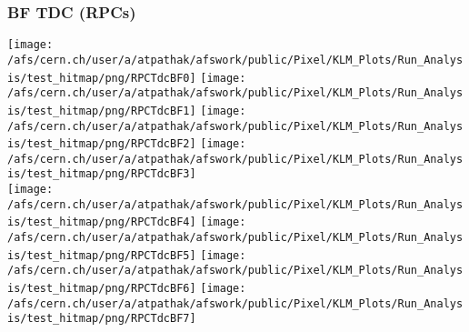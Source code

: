 \documentclass{beamer}
\begin{document}
\begin{frame}
\frametitle{BF TDC (RPCs)}
\vspace*{.05cm}
\begin{center}
\begin{normalsize}

\vspace*{-.2cm}
\begin{center}

  \texttt{[image: /afs/cern.ch/user/a/atpathak/afswork/public/Pixel/KLM\_Plots/Run\_Analysis/test\_hitmap/png/RPCTdcBF0]}
  \texttt{[image: /afs/cern.ch/user/a/atpathak/afswork/public/Pixel/KLM\_Plots/Run\_Analysis/test\_hitmap/png/RPCTdcBF1]}
  \texttt{[image: /afs/cern.ch/user/a/atpathak/afswork/public/Pixel/KLM\_Plots/Run\_Analysis/test\_hitmap/png/RPCTdcBF2]}
  \texttt{[image: /afs/cern.ch/user/a/atpathak/afswork/public/Pixel/KLM\_Plots/Run\_Analysis/test\_hitmap/png/RPCTdcBF3]} \\
  \texttt{[image: /afs/cern.ch/user/a/atpathak/afswork/public/Pixel/KLM\_Plots/Run\_Analysis/test\_hitmap/png/RPCTdcBF4]}
  \texttt{[image: /afs/cern.ch/user/a/atpathak/afswork/public/Pixel/KLM\_Plots/Run\_Analysis/test\_hitmap/png/RPCTdcBF5]}
  \texttt{[image: /afs/cern.ch/user/a/atpathak/afswork/public/Pixel/KLM\_Plots/Run\_Analysis/test\_hitmap/png/RPCTdcBF6]}
  \texttt{[image: /afs/cern.ch/user/a/atpathak/afswork/public/Pixel/KLM\_Plots/Run\_Analysis/test\_hitmap/png/RPCTdcBF7]}


\end{center}
\end{normalsize}
\end{center}
\end{frame}
\end{document}
